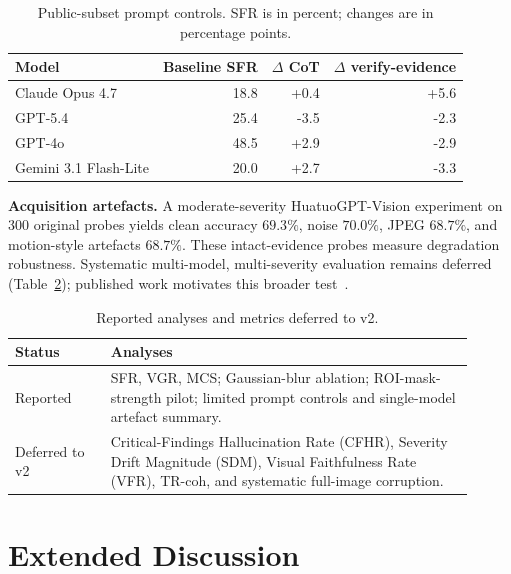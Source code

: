 \documentclass{article}
\begin{document}
\begin{table}[H]
  \footnotesize
  \renewcommand{\arraystretch}{1.1}
  \centering\caption{Public-subset prompt controls. SFR is in percent; changes are in percentage points.}
  \label{tab:prompt_controls}
  \begin{tabular}{lrrr}
    \toprule
    Model & Baseline SFR & $\Delta$ CoT & $\Delta$ verify-evidence \\
    \midrule
    Claude Opus 4.7 & 18.8 & +0.4 & +5.6 \\
    GPT-5.4 & 25.4 & -3.5 & -2.3 \\
    GPT-4o & 48.5 & +2.9 & -2.9 \\
    Gemini 3.1 Flash-Lite & 20.0 & +2.7 & -3.3 \\
    \bottomrule
  \end{tabular}
\end{table}

\textbf{Acquisition artefacts.} A moderate-severity HuatuoGPT-Vision experiment on 300 original probes yields clean accuracy $69.3\%$, noise $70.0\%$, JPEG $68.7\%$, and motion-style artefacts $68.7\%$. These intact-evidence probes measure degradation robustness. Systematic multi-model, multi-severity evaluation remains deferred (Table~\ref{tab:scope_status}); published work motivates this broader test~\cite{cheng2025robustness}.

\begin{table}[H]
  \footnotesize
  \renewcommand{\arraystretch}{1.1}
  \centering\caption{Reported analyses and metrics deferred to v2.}
  \label{tab:scope_status}
  \begin{tabular}{p{0.19\linewidth}p{0.72\linewidth}}
    \toprule
    Status & Analyses \\
    \midrule
    Reported & SFR, VGR, MCS; Gaussian-blur ablation; ROI-mask-strength pilot; limited prompt controls and single-model artefact summary. \\
    Deferred to v2 & Critical-Findings Hallucination Rate (CFHR), Severity Drift Magnitude (SDM), Visual Faithfulness Rate (VFR), TR-coh, and systematic full-image corruption. \\
    \bottomrule
  \end{tabular}
\end{table}

\section{Extended Discussion}
\label{app:extended_discussion}
\end{document}
